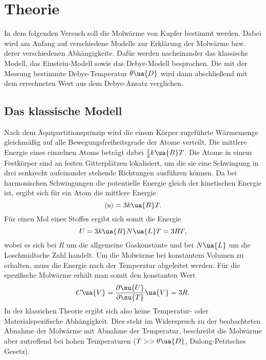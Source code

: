 \section{Theorie}

In dem folgenden Versuch soll die Molwärme von Kupfer bestimmt werden. Dabei wird
am Anfang auf verschiedene Modelle zur Erklärung der Molwärme bzw. derer verschiedenen
Abhängigkeite. Dafür werden nacheinander das klassische Modell, das Einstein-Modell
sowie das Debye-Modell besprochen. Die mit der Messung bestimmte Debye-Temperatur
$\theta\ua{D}$ wird dann abschließend mit dem errechneten Wert aus dem Debye-Ansatz
verglichen.

\subsection{Das klassische Modell}

Nach dem Äquipartitionsprinzip wird die einem Körper zugeführte Wärmemenge
gleichmäßig auf alle Bewegungsfreiheitsgrade der Atome verteilt. Die mittlere
Energie eines einzelnen Atoms beträgt dabei $\frac{1}{2}k\ua{B}T$. Die Atome in
einem Festkörper sind an festen Gitterplätzen lokalisiert, um die sie eine Schwingung
in drei senkrecht aufeinander stehende Richtungen ausführen können. Da bei harmonischen
Schwingungen die potentielle Energie gleich der kinetischen Energie ist, ergibt
sich für ein Atom die mittlere Energie
\begin{equation}
  \langle u \rangle = 3 k\ua{B} T.
\end{equation}
Für einen Mol eines Stoffes ergibt sich somit die Energie
\begin{equation}
  U = 3 k\ua{B} N\ua{L} T = 3 RT,
\end{equation}
wobei es sich bei $R$ um die allgemeine Gaskonstante und bei $N\ua{L}$ um die
Loschmidtsche Zahl handelt. Um die Molwärme bei konstantem Volumen zu erhalten,
muss die Energie nach der Temperatur abgeleitet werden. Für die spezifische Molwärme
erhält man somit den konstanten Wert
\begin{equation}
  C\ua{V} = \frac{\partial \su{U}}{\partial \su{T}}\ua{V} = 3R.
  \label{eqn:CVKlassisch}
\end{equation}
In der klassichen Theorie ergibt sich also keine Temperatur- oder Materialspezifische
Abhängigkeit. Dies steht im Widerspruch zu der beobachteten Abnahme der Molwärme
mit Abnahme der Temperatur, beschreibt die Molwärme aber zutreffend bei hohen Temperaturen
($T >> \theta\ua{D}$, Dulong-Petitsches Gesetz).

